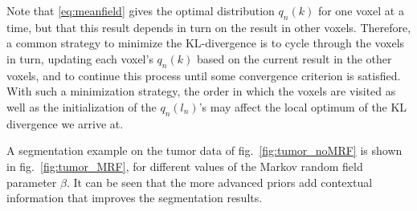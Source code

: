 \documentclass[10pt,twoside]{book}
\begin{document}
Note that \eqref{eq:meanfield} gives the optimal distribution $q_n(k)$ for one voxel at a time, but that this result depends in turn on the result in other voxels. Therefore, a common strategy to minimize the KL-divergence is to cycle through the voxels in turn, updating each voxel's $q_n(k)$ based on the current result in the other voxels, and to continue this process until some convergence criterion is satisfied. With such a minimization strategy, the order in which the voxels are visited as well as the initialization of the $q_n(l_n)$'s may affect the local optimum of the KL divergence we arrive at.

A segmentation example on the tumor data of fig.~\ref{fig:tumor_noMRF} is shown in fig.~\ref{fig:tumor_MRF}, for different values of the Markov random field parameter $\beta$. It can be seen that the more advanced priors add contextual information that improves the segmentation results. 
\end{document}
